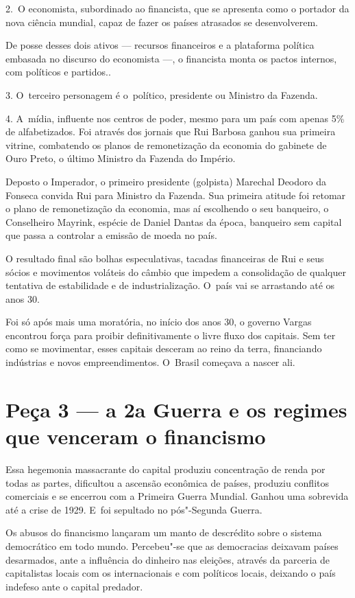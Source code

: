 2.~O economista, subordinado ao financista, que se apresenta como o
portador da nova ciência mundial, capaz de fazer os países atrasados se
desenvolverem.

De posse desses dois ativos --- recursos financeiros e a plataforma
política embasada no discurso do economista \mbox{---,} o financista monta os
pactos internos, com políticos e partidos..

3. O~terceiro personagem é o~político, presidente ou Ministro da
Fazenda.

4. A~mídia, influente nos centros de poder, mesmo para um país com
apenas 5\% de alfabetizados. Foi através dos jornais que Rui Barbosa
ganhou sua primeira vitrine, combatendo os planos de remonetização da
economia do gabinete de Ouro Preto, o último Ministro da Fazenda do
Império.

Deposto o Imperador, o primeiro presidente (golpista) Marechal Deodoro
da Fonseca convida Rui para Ministro da Fazenda. Sua primeira atitude
foi retomar o plano de remonetização da economia, mas aí escolhendo o
seu banqueiro, o Conselheiro Mayrink, espécie de Daniel Dantas da época,
banqueiro sem capital que passa a controlar a emissão de moeda no país.

O resultado final são bolhas especulativas, tacadas financeiras de Rui e
seus sócios e movimentos voláteis do câmbio que impedem a consolidação
de qualquer tentativa de estabilidade e de industrialização. O~país vai
se arrastando até os anos 30.

Foi só após mais uma moratória, no início dos anos 30, o governo Vargas
encontrou força para proibir definitivamente o livre fluxo dos capitais.
Sem ter como se movimentar, esses capitais desceram ao reino da terra,
financiando indústrias e novos empreendimentos. O~Brasil começava a
nascer ali.

\section{Peça 3 --- a 2a Guerra e os regimes que venceram o financismo}

Essa hegemonia massacrante do capital produziu concentração de renda por
todas as partes, dificultou a ascensão econômica de países, produziu
conflitos comerciais e se encerrou com a Primeira Guerra Mundial. Ganhou
uma sobrevida até a crise de 1929. E~foi sepultado no pós"-Segunda
Guerra.

Os abusos do financismo lançaram um manto de descrédito sobre o sistema
democrático em todo mundo. Percebeu"-se que as democracias deixavam
países desarmados, ante a influência do dinheiro nas eleições, através
da parceria de capitalistas locais com os internacionais e com políticos
locais, deixando o país indefeso ante o capital predador.

